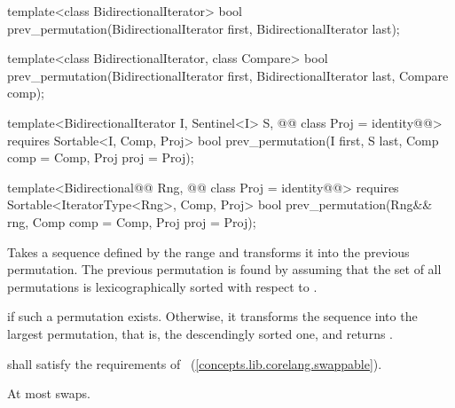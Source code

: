 %
\begin{removedblock}
\begin{itemdecl}
template<class BidirectionalIterator>
  bool prev_permutation(BidirectionalIterator first,
                        BidirectionalIterator last);

template<class BidirectionalIterator, class Compare>
  bool prev_permutation(BidirectionalIterator first,
                        BidirectionalIterator last, Compare comp);
\end{itemdecl}
\end{removedblock}
\begin{addedblock}
\begin{itemdecl}
template<BidirectionalIterator I, Sentinel<I> S, @@
    class Proj = identity@@>
  requires Sortable<I, Comp, Proj>
  bool prev_permutation(I first, S last, Comp comp = Comp{}, Proj proj = Proj{});

template<Bidirectional@@ Rng, @@
    class Proj = identity@@>
  requires Sortable<IteratorType<Rng>, Comp, Proj>
  bool
    prev_permutation(Rng&& rng, Comp comp = Comp{}, Proj proj = Proj{});
\end{itemdecl}
\end{addedblock}

\begin{itemdescr}
\pnum
\effects
Takes a sequence defined by the range
and transforms it into the previous permutation.
The previous permutation is found by assuming that the set of all permutations is
lexicographically sorted with respect to
 .

\pnum
\returns
{}
if such a permutation exists.
Otherwise, it transforms the sequence into the largest permutation,
that is, the descendingly sorted one, and returns
.

\begin{removedblock}
\pnum
\requires
{} shall satisfy the requirements of
~(\ref{concepts.lib.corelang.swappable}).
\end{removedblock}

\pnum
\complexity
At most
swaps.
\end{itemdescr}

